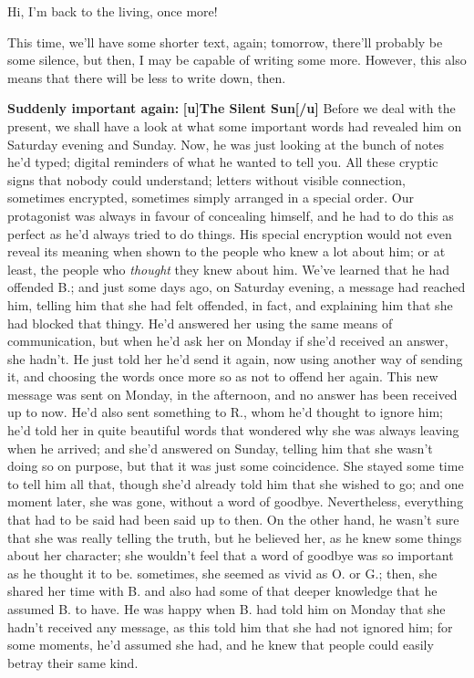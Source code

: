 Hi, I'm back to the living, once more!

This time, we'll have some shorter text, again; tomorrow, there'll probably be some silence, but then, I may be capable of writing some more. However, this also means that there will be less to write down, then. 

\textbf{Suddenly important again:}
\textbf{[u]The Silent Sun[/u]}
Before we deal with the present, we shall have a look at what some important words had revealed him on Saturday evening and Sunday. 
Now, he was just looking at the bunch of notes he'd typed; digital reminders of what he wanted to tell you. All these cryptic signs that nobody could understand; letters without visible connection, sometimes encrypted, sometimes simply arranged in a special order. Our protagonist was always in favour of concealing himself, and he had to do this as perfect as he'd always tried to do things. His special encryption would not even reveal its meaning when shown to the people who knew a lot about him; or at least, the people who \emph{thought} they knew about him. 
We've learned that he had offended B.; and just some days ago, on Saturday evening, a message had reached him, telling him that she had felt offended, in fact, and explaining him that she had blocked that thingy. He'd answered her using the same means of communication, but when he'd ask her on Monday if she'd received an answer, she hadn't. He just told her he'd send it again, now using another way of sending it, and choosing the words once more so as not to offend her again. 
This new message was sent on Monday, in the afternoon, and no answer has been received up to now. 
He'd also sent something to R., whom he'd thought to ignore him; he'd told her in quite beautiful words that wondered why she was always leaving when he arrived; and she'd answered on Sunday, telling him that she wasn't doing so on purpose, but that it was just some coincidence. She stayed some time to tell him all that, though she'd already told him that she wished to go; and one moment later, she was gone, without a word of goodbye. Nevertheless, everything that had to be said had been said up to then. 
On the other hand, he wasn't sure that she was really telling the truth, but he believed her, as he knew some things about her character; she wouldn't feel that a word of goodbye was so important as he thought it to be. sometimes, she seemed as vivid as O. or G.; then, she shared her time with B. and also had some of that deeper knowledge that he assumed B. to have. 
He was happy when B. had told him on Monday that she hadn't received any message, as this told him that she had not ignored him; for some moments, he'd assumed she had, and he knew that people could easily betray their same kind. 
